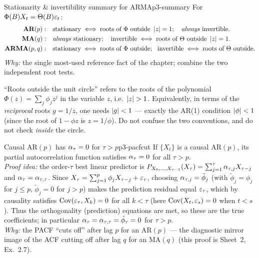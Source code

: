 \begin{corollary}{Stationarity \& invertibility summary for ARMA}{p3-summary}
For $\Phi(B)X_t=\Theta(B)\varepsilon_t$:
\[
\begin{aligned}
\textbf{AR}(p):&\quad \text{stationary}\iff \text{roots of }\Phi\ \text{outside }\abs{z}=1;\quad \text{\emph{always} invertible.}\\
\textbf{MA}(q):&\quad \text{\emph{always} stationary};\quad \text{invertible}\iff \text{roots of }\Theta\ \text{outside }\abs{z}=1.\\
\textbf{ARMA}(p,q):&\quad \text{stationary}\iff \text{roots of }\Phi\ \text{outside};\ \ \text{invertible}\iff \text{roots of }\Theta\ \text{outside.}
\end{aligned}
\]
\textit{Why:} the single most-used reference fact of the chapter; combine the
two independent root tests.
\end{corollary}

\begin{pitfall}
``Roots outside the unit circle'' refers to the roots of the polynomial
$\Phi(z)=\sum_j\phi_j z^j$ in the variable $z$, i.e.\ $\left\lvert z \right\rvert>1$. Equivalently,
in terms of the \emph{reciprocal} roots $g=1/z$, one needs $\left\lvert g \right\rvert<1$ ---
exactly the AR(1) condition $\left\lvert \phi \right\rvert<1$ (since the root of $1-\phi z$ is
$z=1/\phi$). Do not confuse the two conventions, and do not check
\emph{inside} the circle.
\end{pitfall}

\begin{proposition}{Causal $\mathrm{AR}(p)$ has $\alpha_\tau=0$ for $\tau>p$}{p3-pacfcut}
If $\{X_t\}$ is a causal $\mathrm{AR}(p)$, its partial autocorrelation function
satisfies $\alpha_\tau=0$ for all $\tau>p$.\\
\textit{Proof idea:} the order-$\tau$ best linear predictor is
$P_{X_0,\dots,X_{\tau-1}}(X_\tau)=\sum_{j=1}^{\tau}\alpha_{\tau,j}X_{\tau-j}$ and
$\alpha_\tau=\alpha_{\tau,\tau}$. Since
$X_\tau=\sum_{j=1}^p\phi_j X_{\tau-j}+\varepsilon_\tau$, choosing
$\alpha_{\tau,j}=\tilde\phi_j$ (with $\tilde\phi_j=\phi_j$ for $j\le p$,
$\tilde\phi_j=0$ for $j>p$) makes the prediction residual equal $\varepsilon_\tau$,
which by causality satisfies $\operatorname{Cov}(\varepsilon_\tau,X_k)=0$ for all $k<\tau$ (here
$\operatorname{Cov}(X_t,\varepsilon_s)=0$ when $t<s$). Thus the orthogonality (prediction) equations
are met, so these are the true coefficients; in particular
$\alpha_\tau=\alpha_{\tau,\tau}=\tilde\phi_\tau=0$ for $\tau>p$.\\
\textit{Why:} the PACF ``cuts off'' after lag $p$ for an $\mathrm{AR}(p)$ ---
the diagnostic mirror image of the ACF cutting off after lag $q$ for an
$\mathrm{MA}(q)$ (this proof is Sheet~2, Ex.~2.7).
\end{proposition}

